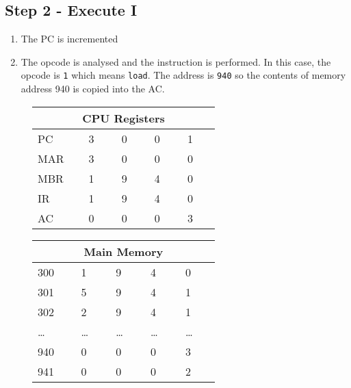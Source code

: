 \subsection*{Step 2 - Execute I}
\begin{enumerate}
    \item The PC is incremented
    \item The opcode is analysed and the instruction is performed. In this case, the opcode is \verb|1| which means \verb|load|. The address is \verb|940| so the contents of memory address 940 is copied into the AC. 
\end{enumerate}
\begin{figure}[H]
    \begin{minipage}[t]{0.45\textwidth}
        \centering
        \begin{tabular}[H]{p{0.15\linewidth} p{0.12\linewidth} p{0.12\linewidth} p{0.12\linewidth} p{0.12\linewidth}}
            \multicolumn{5}{c}{\textbf{CPU Registers}}\\
            \hline
            \hline
            PC & 3 & 0 & 0 & 1 \\
            \hline
            MAR & 3 & 0 & 0 & 0 \\
            \hline
            MBR & 1 & 9 & 4 & 0 \\
            \hline
            IR & 1 & 9 & 4 & 0 \\
            \hline
            AC & 0 & 0 & 0 & 3 \\
            \hline
        \end{tabular}
    \end{minipage}\hfill
    \begin{minipage}[t]{0.45\textwidth}
        \centering
        \begin{tabular}[H]{p{0.15\linewidth} p{0.12\linewidth} p{0.12\linewidth} p{0.12\linewidth} p{0.12\linewidth}}
            \multicolumn{5}{c}{\textbf{Main Memory}}\\
            \hline
            \hline
            300 & 1 & 9 & 4 & 0 \\
            \hline
            301 & 5 & 9 & 4 & 1 \\
            \hline
            302 & 2 & 9 & 4 & 1 \\
            \hline
            \ldots & \ldots & \ldots & \ldots & \ldots \\
            \hline
            940 & 0 & 0 & 0 & 3 \\
            \hline
            941 & 0 & 0 & 0 & 2 \\
            \hline
        \end{tabular}
    \end{minipage}\hfill
\end{figure}

